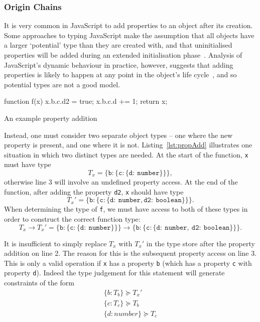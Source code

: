 \documentclass[12pt,a4paper,twoside,openright]{report}
\theoremstyle{definition}
\theoremstyle{dotless}
\newcommand*{\js}{\texttt}
\begin{document}
\subsubsection*{Origin Chains}

It is very common in JavaScript to add properties to an object
after its creation. Some approaches to typing JavaScript make the assumption
that all objects have a larger `potential' type than they are created with, and
that uninitialised properties will be added during an extended initialisation
phase~\cite{anderson05}. Analysis of JavaScript's dynamic behaviour in
practice, however, suggests that adding properties is likely to happen at any
point in the object's life cycle~\cite{JSBehaviour}, and so potential types are
not a good model.

\begin{listing}[t]
  \centering
  \begin{minipage}[b]{0.45\linewidth}
 	\begin{jscript}
	  function f(x) {
	 	x.b.c.d2 = true;
	 	x.b.c.d += 1;
	 	return x;
	  }	
 	\end{jscript}
 	\vspace{23mm}
  \end{minipage}
  \quad
  \begin{minipage}[b]{0.45\linewidth}
  \end{minipage}
  \caption{An example property addition}\label{lst:propAdd}
\end{listing}
Instead, one must consider two separate object types -- one where the new
property is present, and one where it is not. Listing~\ref{lst:propAdd}
illustrates one situation in which two distinct types are needed. At the start
of the function, \js{x} must have type 
$$T_x = \mathtt{\{b:\{c:\{d:\ number\}\}\}},$$
otherwise line 3 will involve an undefined property access. At the end of the
function, after adding the property \js{d2}, \js{x} should have type 
$$T_x' = \mathtt{\{b:\{c:\{d:\ number, d2:\ boolean\}\}\}}.$$
When determining the type
of \js{f}, we must have access to both of these types in order to construct the
correct function type: 
$$
T_x \rightarrow T_x' =
\mathtt{\{b:\{c:\{d:\ number\}\}\} \rightarrow
  \{b:\{c:\{d:\ number,\ d2:\ boolean\}\}\}}.
$$

It is insufficient to simply replace $T_x$
with $T_x'$ in the type store after the property addition on line 2.  The reason for this
is the subsequent property access on line 3. This is only a valid operation if \js{x} has
a property \js{b} (which has a property \js{c} with property \js{d}). Indeed the
type judgement for this statement will generate constraints of the form 
\begin{equation}
  \begin{split}
 	\label{eq:barC}
 	\{b:T_b\} \succeq T_x' \\
 	\{c:T_c\} \succeq T_b \\
 	\{d:number\} \succeq T_c \\
  \end{split}
\end{equation}
\end{document}
